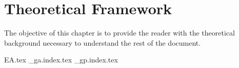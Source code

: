 \chapter{Theoretical Framework}
\label{chap:theoretical_framework}
  The objective of this chapter is to provide the reader with the theoretical 
  background necessary to understand the rest of the document.
  
  {EA.tex}
  {_ga.index.tex}
  {_gp.index.tex}
  